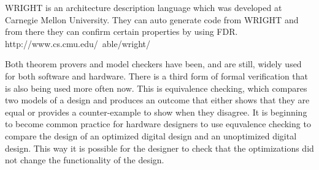 





%

WRIGHT\cite{Allen1997}\cite{Allen1997a} %
is an architecture description language which was developed at Carnegie Mellon University. They can auto generate \cspm code from WRIGHT and from there they can confirm certain properties by using FDR. http://www.cs.cmu.edu/~able/wright/



Both theorem provers and model checkers have been, and are still, widely used for both software and hardware. There is a third form of formal verification that is also being used more often now. This is equivalence checking, which compares two models of a design and produces an outcome that either shows that they are equal or provides a counter-example to show when they disagree. It is beginning to become common practice for hardware designers to use equvalence checking to compare the design of an optimized digital design and an unoptimized digital design. This way it is possible for the designer to check that the optimizations did not change the functionality of the design.


